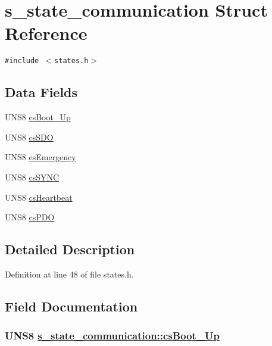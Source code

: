 \hypertarget{structs__state__communication}{
\section{s\_\-state\_\-communication Struct Reference}
\label{structs__state__communication}
}
{\tt \#include $<$states.h$>$}

\subsection*{Data Fields}
\begin{CompactItemize}
\item 
UNS8 \hyperlink{structs__state__communication_e56b47ebc583d8fa0f1ce42f8a46a338}{cs\-Boot\_\-Up}
\item 
UNS8 \hyperlink{structs__state__communication_c6f5d674a8f305fc8eacdcd258c17ba8}{cs\-SDO}
\item 
UNS8 \hyperlink{structs__state__communication_42d1093b9e6625029428944fdc7c7f5a}{cs\-Emergency}
\item 
UNS8 \hyperlink{structs__state__communication_9a4709f6f39e18b303c91edbfd1d6220}{cs\-SYNC}
\item 
UNS8 \hyperlink{structs__state__communication_1d467631df619c6c321c3fc040a3eb22}{cs\-Heartbeat}
\item 
UNS8 \hyperlink{structs__state__communication_10a8f36d2c3f270feda5f07cf34155d2}{cs\-PDO}
\end{CompactItemize}


\subsection{Detailed Description}




Definition at line 48 of file states.h.

\subsection{Field Documentation}
\hypertarget{structs__state__communication_e56b47ebc583d8fa0f1ce42f8a46a338}{
\subsubsection[csBoot\_\-Up]{\setlength{\rightskip}{0pt plus 5cm}UNS8 \hyperlink{structs__state__communication_e56b47ebc583d8fa0f1ce42f8a46a338}{s\_\-state\_\-communication::cs\-Boot\_\-Up}}}
\label{structs__state__communication_e56b47ebc583d8fa0f1ce42f8a46a338}




